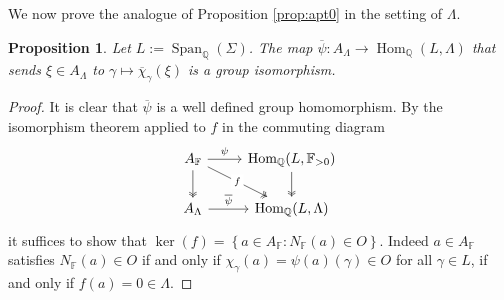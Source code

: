\documentclass[12pt]{amsart}
\newcommand{\F}{\mathbb{F} }
\newcommand{\Q}{\mathbb{Q} }
\numberwithin{equation}{section}
\newtheorem{proposition}[theorem]{Proposition}
\theoremstyle{remark} %
\begin{document}
We now prove the analogue of Proposition \ref{prop:apt0} in the setting of $\Lambda$.

\begin{proposition}\label{prop:apt1}
	Let $L:= \operatorname{Span}_{\Q}(\Sigma)$. The map $\overline{\psi} \colon A_\Lambda \to \operatorname{Hom}_{\Q}(L,\Lambda)$ that sends $\xi \in A_\Lambda$ to $\gamma \mapsto \overline{\chi}_\gamma(\xi)$ is a group isomorphism.
\end{proposition}
\begin{proof}
	It is clear that $\overline{\psi}$ is a well defined group homomorphism. By the isomorphism theorem applied to $f$ in the commuting diagram
	$$%
	\begin{tikzcd}
		A_{\mathbb{F}} \arrow[r, "\psi"] \arrow[d, two heads] \arrow[rd, "f" description, two heads] & {\operatorname{Hom}_{\mathbb{Q}}(L,\mathbb{F}_{>0})} \arrow[d, two heads] \\
		A_{\Lambda} \arrow[r, "\overline{\psi}"]                                                     & {\operatorname{Hom}_{\mathbb{Q}}(L,\Lambda)}                            
	\end{tikzcd}
$$
	it suffices to show that $\operatorname{ker}(f) = \left\{ a \in A_\F \colon N_\F(a) \in O \right\}$. Indeed $a\in A_\F$ satisfies $N_\F(a)\in O$ if and only if $\chi_\gamma(a) = \psi(a)(\gamma)\in O$ for all $\gamma \in L$, if and only if $f(a) = 0 \in \Lambda$.
\end{proof}
\end{document}
